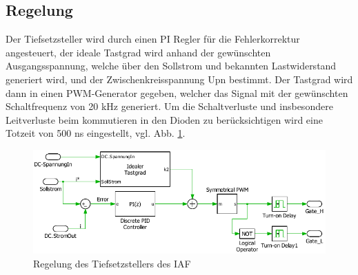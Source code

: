 	\subsection{Regelung}
		Der Tiefsetzsteller wird durch einen PI Regler für die Fehlerkorrektur angesteuert, der ideale Tastgrad wird anhand der gewünschten Ausgangsspannung, welche über den Sollstrom und bekannten Lastwiderstand generiert wird, und der Zwischenkreisspannung \gls{Upn} bestimmt. Der Tastgrad wird dann in einen PWM-Generator gegeben, welcher das Signal mit der gewünschten Schaltfrequenz von 20 kHz generiert. Um die Schaltverluste und insbesondere Leitverluste beim kommutieren in den Dioden zu berücksichtigen wird eine Totzeit von 500 \si{\nano \second} eingestellt, vgl. Abb. \ref{fig:iafbuckcontrol}.
		\begin{figure}[H]
			\centering
			\includegraphics[width=0.9\linewidth]{content/Grafiken/IAF_BuckControl}
			\caption{Regelung des Tiefsetzstellers des IAF}
			\label{fig:iafbuckcontrol}
		\end{figure}
		
